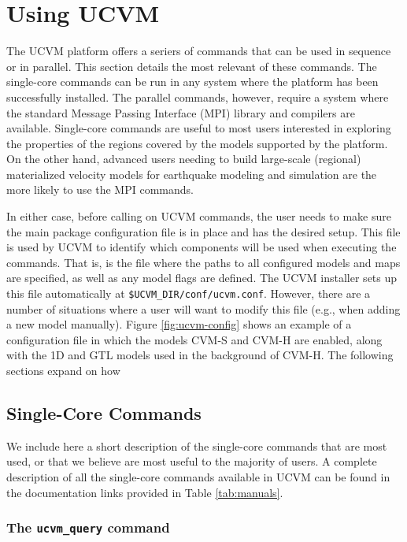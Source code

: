 
\section{Using UCVM}

The UCVM platform offers a seriers of commands that can be used in sequence or in parallel. This section details the most relevant of these commands. The single-core commands can be run in any system where the platform has been successfully installed. The parallel commands, however, require a system where the standard Message Passing Interface (MPI) library and compilers are available. Single-core commands are useful to most users interested in exploring the properties of the regions covered by the models supported by the platform. On the other hand, advanced users needing to build large-scale (regional) materialized velocity models for earthquake modeling and simulation are the more likely to use the MPI commands. 

In either case, before calling on UCVM commands, the user needs to make sure the main package configuration file is in place and has the desired setup. This file is used by UCVM to identify which components will be used when executing the commands. That is, is the file where the paths to all configured models and maps are specified, as well as any model flags are defined. The UCVM installer sets up this file automatically at \texttt{\$UCVM\_DIR/conf/ucvm.conf}. However, there are a number of situations where a user will want to modify this file (e.g., when adding a new model manually). Figure \ref{fig:ucvm-config} shows an example of a configuration file in which the models CVM-S and CVM-H are enabled, along with the 1D and GTL models used in the background of CVM-H. The following sections expand on how



\subsection{Single-Core Commands}

We include here a short description of the single-core commands that are most used, or that we believe are most useful to the majority of users. A complete description of all the single-core commands available in UCVM can be found in the documentation links provided in Table \ref{tab:manuals}.

\subsubsection{The \textup{\texttt{ucvm\_query}} command}

